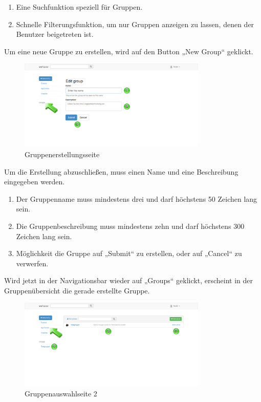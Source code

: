 \begin{enumerate}
\item Eine Suchfunktion speziell für Gruppen.
\item Schnelle Filterungsfunktion, um nur Gruppen anzeigen zu lassen, denen der Benutzer beigetreten ist.

\end{enumerate}


Um eine neue Gruppe zu erstellen, wird auf den Button „New Group“ geklickt.

\begin{figure}[H]
    \centering
    \includegraphics[width=0.8\textwidth]{Bilder/18.png}
    \caption{Gruppenerstellungsseite }
    \label{fig:gruppenerstellungsseite}
\end{figure}


Um die Erstellung abzuschließen, muss einen Name und eine Beschreibung eingegeben werden.

\begin{enumerate}
\item Der Gruppenname muss mindestens drei und darf höchstens 50 Zeichen lang sein.
\item Die Gruppenbeschreibung muss mindestens zehn und darf höchstens 300 Zeichen lang sein.
\item Möglichkeit die Gruppe auf „Submit“ zu erstellen, oder auf „Cancel“ zu verwerfen.
\end{enumerate}


Wird jetzt in der Navigationsbar wieder auf „Groups“ geklickt, erscheint in der Gruppenübersicht die gerade erstellte Gruppe.

\begin{figure}[H]
    \centering
    \includegraphics[width=0.8\textwidth]{Bilder/19.png}
    \caption{Gruppenauswahlseite 2}
    \label{fig:gruppenauswahlseite2}
\end{figure}



